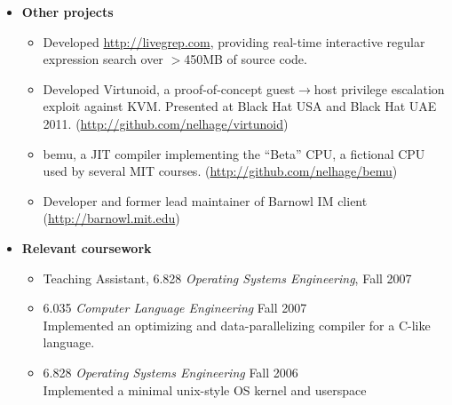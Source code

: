 \documentclass[letterpaper,10pt]{article}
\begin{document}
\begin{itemize}
  \item \textbf{Other projects} \\
    \vspace*{-0.5cm}
    \begin{itemize}
    \item Developed \url{http://livegrep.com}, providing real-time
      interactive regular expression search over $>$450MB of source
      code.
    \item Developed Virtunoid, a proof-of-concept
      guest$\rightarrow$host privilege escalation exploit against
      KVM. Presented at Black Hat USA and Black Hat UAE
      2011. (\url{http://github.com/nelhage/virtunoid})
    \item bemu, a JIT compiler implementing the ``Beta'' CPU, a
      fictional CPU used by several MIT
      courses. (\url{http://github.com/nelhage/bemu})
    \item Developer and former lead maintainer of Barnowl IM client
      (\url{http://barnowl.mit.edu})
    \end{itemize}

  \item \textbf{Relevant coursework}
  \begin{itemize}
      \item Teaching Assistant, 6.828 {\em Operating Systems Engineering}, Fall 2007
      \item 6.035 {\em Computer Language Engineering} Fall 2007 \\
        Implemented an optimizing and data-parallelizing compiler for a
        C-like language.
      \item 6.828 {\em Operating Systems Engineering} Fall 2006 \\
        Implemented a minimal unix-style OS kernel and userspace
  \end{itemize}
\end{itemize}
\end{document}
